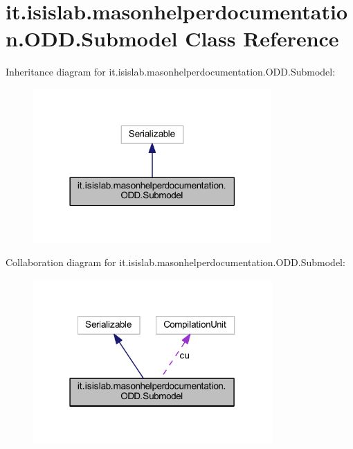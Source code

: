\hypertarget{classit_1_1isislab_1_1masonhelperdocumentation_1_1_o_d_d_1_1_submodel}{\section{it.\-isislab.\-masonhelperdocumentation.\-O\-D\-D.\-Submodel Class Reference}
\label{classit_1_1isislab_1_1masonhelperdocumentation_1_1_o_d_d_1_1_submodel}
}


Inheritance diagram for it.\-isislab.\-masonhelperdocumentation.\-O\-D\-D.\-Submodel\-:
\nopagebreak
\begin{figure}[H]
\begin{center}
\leavevmode
\includegraphics[width=258pt]{classit_1_1isislab_1_1masonhelperdocumentation_1_1_o_d_d_1_1_submodel__inherit__graph}
\end{center}
\end{figure}


Collaboration diagram for it.\-isislab.\-masonhelperdocumentation.\-O\-D\-D.\-Submodel\-:
\nopagebreak
\begin{figure}[H]
\begin{center}
\leavevmode
\includegraphics[width=259pt]{classit_1_1isislab_1_1masonhelperdocumentation_1_1_o_d_d_1_1_submodel__coll__graph}
\end{center}
\end{figure}
